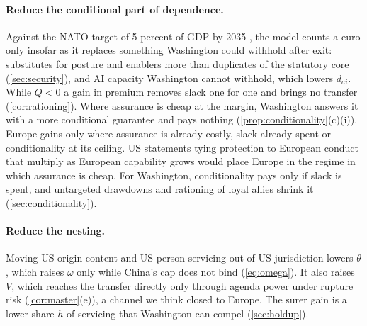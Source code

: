 \paragraph{Reduce the conditional part of dependence.} Against the NATO target of 5 percent of GDP by 2035 \citep{nato2025hague}, the model counts a euro only insofar as it replaces something Washington could withhold after exit: substitutes for posture and enablers more than duplicates of the statutory core (\cref{sec:security}), and AI capacity Washington cannot withhold, which lowers $d_{ai}$. While $Q<0$ a gain in premium removes slack one for one and brings no transfer (\cref{cor:rationing}). Where assurance is cheap at the margin, Washington answers it with a more conditional guarantee and pays nothing (\cref{prop:conditionality}(c)(i)). Europe gains only where assurance is already costly, slack already spent or conditionality at its ceiling. US statements tying protection to European conduct that multiply as European capability grows would place Europe in the regime in which assurance is cheap. For Washington, conditionality pays only if slack is spent, and untargeted drawdowns and rationing of loyal allies shrink it (\cref{sec:conditionality}).

\paragraph{Reduce the nesting.} Moving US-origin content and US-person servicing out of US jurisdiction lowers $\theta$, which raises $\omega$ only while China's cap does not bind (\cref{eq:omega}). It also raises $V$, which reaches the transfer directly only through agenda power under rupture risk (\cref{cor:master}(e)), a channel we think closed to Europe. The surer gain is a lower share $h$ of servicing that Washington can compel (\cref{sec:holdup}).

